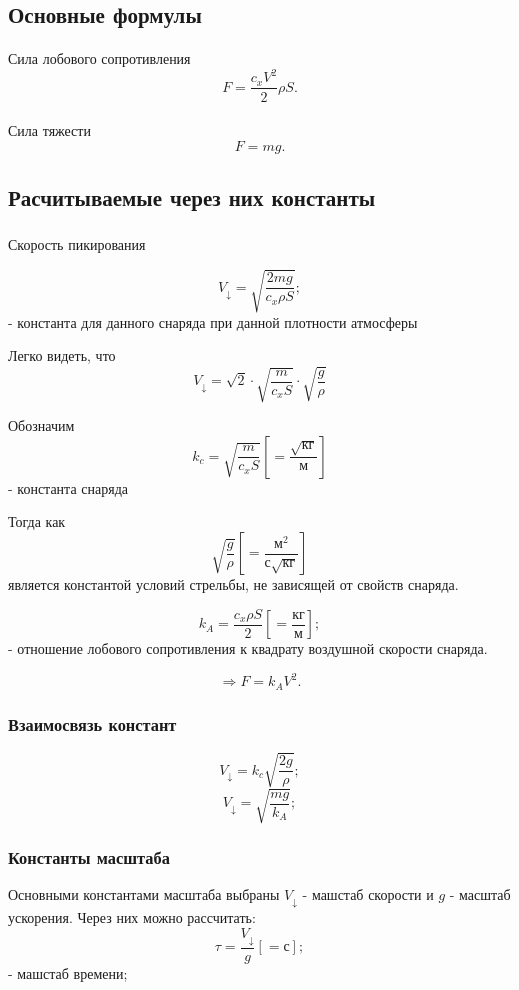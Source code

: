 \subsection{Основные формулы}

\paragraph{}Сила лобового сопротивления
$$ F=\frac{c_{x}V^{2}}{2}\rho S. $$

\paragraph{}Сила тяжести
$$ F = mg. $$

\subsection{Расчитываемые через них константы}
\subsubsection{}
Скорость пикирования

$$V_{\downarrow}=\sqrt{\frac{2mg}{c_{x} \rho S}};$$
- константа для данного снаряда при данной плотности атмосферы

Легко видеть, что 
$$V_{\downarrow}=\sqrt{2} \cdot \sqrt{\frac{m}{c_{x} S}} \cdot \sqrt{\frac{g}{\rho}}$$

Обозначим 
$$k_c = \sqrt{\frac{m}{c_{x} S}} \left [ =\frac{\sqrt{\mbox{кг}}}{\mbox{м}} \right ]$$
- константа снаряда

Тогда как $$\sqrt{\frac{g}{\rho}} \left [ =\frac{\mbox{м}^2}{\mbox{с}\sqrt{\mbox{кг}}} \right ]$$ является константой условий стрельбы, не зависящей от свойств снаряда.

$$k_A = \frac{c_x \rho S}{2} \left [ =\frac{\mbox{кг}}{\mbox{м}} \right ];$$
- отношение лобового сопротивления к квадрату воздушной скорости снаряда.

$$\Rightarrow F = k_A V^2.$$

\subsubsection{Взаимосвязь констант}

$$V_{\downarrow}=k_c \sqrt{\frac{2g}{\rho}};$$
$$V_{\downarrow}= \sqrt{\frac{mg}{k_A}};$$

\subsubsection{Константы масштаба}
Основными константами масштаба выбраны $V_\downarrow$ - машстаб скорости и $g$ - масштаб ускорения.
Через них можно рассчитать:
$$\tau = \frac{V_\downarrow}{g}\left [=\mbox{с} \right ];$$
- машстаб времени;

